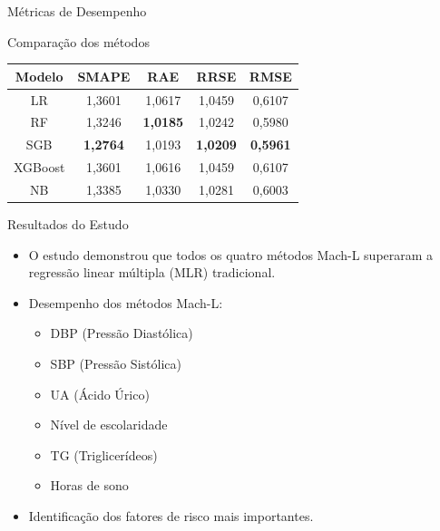\begin{frame}{Métricas de Desempenho}
	\centering
\end{frame}

\begin{frame}{Comparação dos métodos}
	\centering
	\begin{tabular}{|c|c|c|c|c|}
		\hline
		\textbf{Modelo} & \textbf{SMAPE} & \textbf{RAE} & \textbf{RRSE} & \textbf{RMSE} \\
		\hline
		LR & 1,3601 & 1,0617 & 1,0459 & 0,6107 \\
		\hline
		RF & 1,3246 & \textbf{1,0185} & 1,0242 & 0,5980 \\
		\hline
		SGB & \textbf{1,2764} & 1,0193 & \textbf{1,0209} & \textbf{0,5961} \\
		\hline
		XGBoost & 1,3601 & 1,0616 & 1,0459 & 0,6107 \\
		\hline
		NB & 1,3385 & 1,0330 & 1,0281 & 0,6003 \\
		\hline
	\end{tabular}
\end{frame}

\begin{frame}{Resultados do Estudo}
	\begin{itemize}
		\item O estudo demonstrou que todos os quatro métodos Mach-L superaram a regressão linear múltipla (MLR) tradicional.
		\item Desempenho dos métodos Mach-L:
		\begin{itemize}
			\item DBP (Pressão Diastólica)
			\item SBP (Pressão Sistólica)
			\item UA (Ácido Úrico)
			\item Nível de escolaridade
			\item TG (Triglicerídeos)
			\item Horas de sono
		\end{itemize}
		\item Identificação dos fatores de risco mais importantes.
	\end{itemize}
\end{frame}

